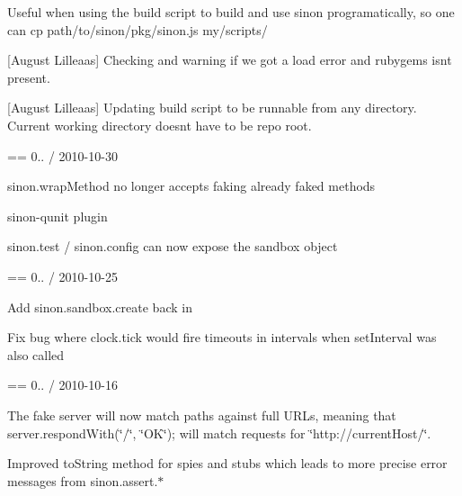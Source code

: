 \begin{DoxyItemize}
Useful when using the build script to build and use sinon programatically, so one can \textquotesingle{}cp path/to/sinon/pkg/sinon.\+js my/scripts/\textquotesingle{}
\item \mbox{[}August Lilleaas\mbox{]} Checking and warning if we got a load error and rubygems isn\textquotesingle{}t present.
\item \mbox{[}August Lilleaas\mbox{]} Updating build script to be runnable from any directory. Current working directory doesn\textquotesingle{}t have to be repo root.
\end{DoxyItemize}

== 0.. / 2010-\/10-\/30
\begin{DoxyItemize}
\item sinon.\+wrap\+Method no longer accepts faking already faked methods
\item sinon-\/qunit \textquotesingle{}plugin\textquotesingle{}
\item sinon.\+test / sinon.\+config can now expose the sandbox object
\end{DoxyItemize}

== 0.. / 2010-\/10-\/25
\begin{DoxyItemize}
\item Add sinon.\+sandbox.\+create back in
\item Fix bug where clock.\+tick would fire timeouts in intervals when set\+Interval was also called
\end{DoxyItemize}

== 0.. / 2010-\/10-\/16
\begin{DoxyItemize}
\item The fake server will now match paths against full U\+R\+Ls, meaning that server.\+respond\+With(\char`\"{}/\char`\"{}, \char`\"{}\+O\+K\char`\"{}); will match requests for \char`\"{}http\+://current\+Host/\char`\"{}.
\item Improved to\+String method for spies and stubs which leads to more precise error messages from sinon.\+assert.$\ast$
\end{DoxyItemize}

